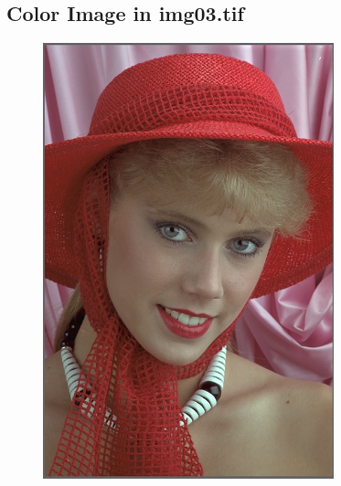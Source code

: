 \documentclass{article}
\begin{document}
\subsection{Color Image in img03.tif}
\begin{figure}[H]
    \centering
    \includegraphics[width=0.75\textwidth]{../results/img03.png}
    \begin{center}
    \end{center}
    \label{fig:A1}
\end{figure}
\end{document}

